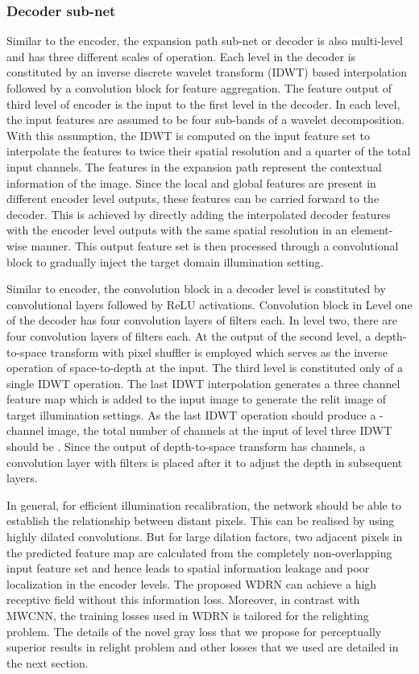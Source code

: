 \documentclass[runningheads]{llncs}
\begin{document}
\subsubsection{Decoder sub-net}
\par Similar to the encoder, the expansion path sub-net or decoder is also multi-level and has three different scales of operation. Each level in the decoder is constituted by an inverse discrete wavelet transform (IDWT) based interpolation followed by a convolution block for feature aggregation. The feature output of third level of encoder is the input to the first level in the decoder. In each level, the input features are assumed to be four sub-bands of a wavelet decomposition. With this assumption, the IDWT is computed on the input feature set to interpolate the features to twice their spatial resolution and a quarter of the total input channels. The features in the expansion path represent the contextual information of the image. Since the local and global features are present in different encoder level outputs, these features can be carried forward to the decoder. This is achieved by directly adding the interpolated decoder features with the encoder level outputs with the same spatial resolution in an element-wise manner. This output feature set is then processed through a convolutional block to gradually inject the target domain illumination setting. 
\par Similar to encoder, the convolution block in a decoder level is constituted by convolutional layers followed by ReLU activations. Convolution block in Level one of the decoder has four convolution layers of  filters each. In level two, there are four convolution layers of  filters each. At the output of the second level, a depth-to-space transform with pixel shuffler is employed which serves as the inverse operation of space-to-depth at the input. The third level is constituted only of a single IDWT operation. The last IDWT interpolation generates a three channel feature map which is added to the input image to generate the relit image of target illumination settings. As the last IDWT operation should produce a -channel image, the total number of channels at the input of level three IDWT should be . Since the output of depth-to-space transform has  channels, a convolution layer with  filters is placed after it to adjust the depth in subsequent layers. 
\par In general, for efficient illumination recalibration, the network should be able to establish the relationship between distant pixels. This can be realised by using highly dilated convolutions. But for large dilation factors, two adjacent pixels in the predicted feature map are calculated from the completely non-overlapping input feature set and hence leads to spatial information leakage and poor localization in the encoder levels. The proposed WDRN can achieve a high receptive field without this information loss. Moreover, in contrast with MWCNN, the training losses used in WDRN is tailored for the relighting problem. The details of the novel gray loss that we propose for perceptually superior results in relight problem and other losses that we used are detailed in the next section.
\end{document}
